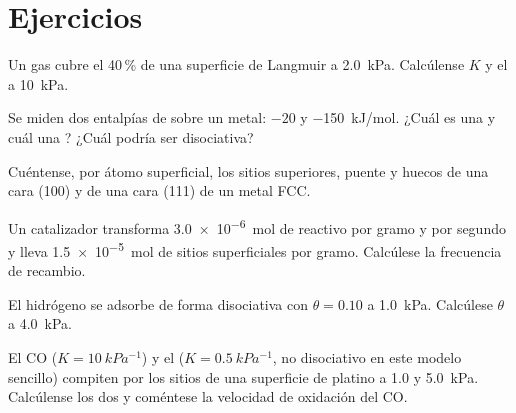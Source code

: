 \section{Ejercicios}

\begin{exercise}[$\star$]\label{exo:b3:surfaces-catalysis:1}
Un gas cubre el 40\,\% de una superficie de Langmuir a \qty{2.0}{kPa}. Calcúlense $K$ y el  a
\qty{10}{kPa}.
\end{exercise}

\begin{exercise}[$\star$]\label{exo:b3:surfaces-catalysis:2}
Se miden dos entalpías de  sobre un metal: $-20$ y \qty{-150}{kJ/mol}. ¿Cuál
es una  y cuál una ? ¿Cuál podría ser disociativa?
\end{exercise}

\begin{exercise}[$\star$]\label{exo:b3:surfaces-catalysis:3}
Cuéntense, por átomo superficial, los sitios superiores, puente y huecos de una cara (100) y de
una cara (111) de un metal FCC.
\end{exercise}

\begin{exercise}[$\star$]\label{exo:b3:surfaces-catalysis:4}
Un catalizador transforma \qty{3.0e-6}{mol} de reactivo por gramo y por segundo y lleva
\qty{1.5e-5}{mol} de sitios superficiales por gramo. Calcúlese la frecuencia de recambio.
\end{exercise}

\begin{exercise}[$\star\star$]\label{exo:b3:surfaces-catalysis:5}
El hidrógeno se adsorbe de forma disociativa con $\theta = 0.10$ a \qty{1.0}{kPa}. Calcúlese $\theta$ a \qty{4.0}{kPa}.
\end{exercise}

\begin{exercise}[$\star\star$]\label{exo:b3:surfaces-catalysis:6}
El CO ($K = \qty{10}{kPa^{-1}}$) y el  ($K = \qty{0.5}{kPa^{-1}}$, no disociativo en este modelo sencillo)
compiten por los sitios de una superficie de platino a 1.0 y \qty{5.0}{kPa}. Calcúlense los dos
 y coméntese la velocidad de oxidación del CO.
\end{exercise}

